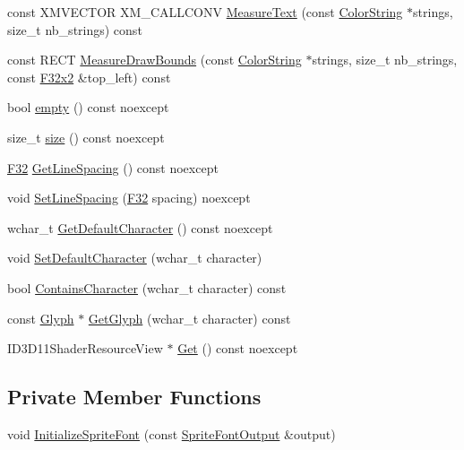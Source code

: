\begin{DoxyCompactItemize}
\item 
const X\+M\+V\+E\+C\+T\+OR X\+M\+\_\+\+C\+A\+L\+L\+C\+O\+NV \hyperlink{classmage_1_1_sprite_font_a1863253a1c804f854c019d837272e892}{Measure\+Text} (const \hyperlink{classmage_1_1_color_string}{Color\+String} $\ast$strings, size\+\_\+t nb\+\_\+strings) const
\item 
const R\+E\+CT \hyperlink{classmage_1_1_sprite_font_af0c58192fcf484c008ee17e79cab3f4e}{Measure\+Draw\+Bounds} (const \hyperlink{classmage_1_1_color_string}{Color\+String} $\ast$strings, size\+\_\+t nb\+\_\+strings, const \hyperlink{namespacemage_aa87237ad091f5cd7da612b8523fc108f}{F32x2} \&top\+\_\+left) const
\item 
bool \hyperlink{classmage_1_1_sprite_font_a5bb9c8d6288fdc50008bd24312b78e4f}{empty} () const noexcept
\item 
size\+\_\+t \hyperlink{classmage_1_1_sprite_font_a2c80b7c8c460c6fc9edacc78ba4476cb}{size} () const noexcept
\item 
\hyperlink{namespacemage_aa97e833b45f06d60a0a9c4fc22ae02c0}{F32} \hyperlink{classmage_1_1_sprite_font_ac64978e793aa09bf3fa163b02071ab5b}{Get\+Line\+Spacing} () const noexcept
\item 
void \hyperlink{classmage_1_1_sprite_font_afcbdf433fea7da7802c23ef53eb9e5ad}{Set\+Line\+Spacing} (\hyperlink{namespacemage_aa97e833b45f06d60a0a9c4fc22ae02c0}{F32} spacing) noexcept
\item 
wchar\+\_\+t \hyperlink{classmage_1_1_sprite_font_a9be513809e714558708cab21a22d7316}{Get\+Default\+Character} () const noexcept
\item 
void \hyperlink{classmage_1_1_sprite_font_a0b0feb25673d6f9d9e3215167800d817}{Set\+Default\+Character} (wchar\+\_\+t character)
\item 
bool \hyperlink{classmage_1_1_sprite_font_a01836c4197661dbdd66c624d8dc6a7c3}{Contains\+Character} (wchar\+\_\+t character) const
\item 
const \hyperlink{structmage_1_1_glyph}{Glyph} $\ast$ \hyperlink{classmage_1_1_sprite_font_aa13424a1e0153ffb9433bb2cb416360b}{Get\+Glyph} (wchar\+\_\+t character) const
\item 
I\+D3\+D11\+Shader\+Resource\+View $\ast$ \hyperlink{classmage_1_1_sprite_font_a8e43f8d97fb7e5ee03ed49fb45ee1b5f}{Get} () const noexcept
\end{DoxyCompactItemize}
\subsection*{Private Member Functions}
\begin{DoxyCompactItemize}
\item 
void \hyperlink{classmage_1_1_sprite_font_ae0edccbf98f4bd3b3195fa602baee121}{Initialize\+Sprite\+Font} (const \hyperlink{structmage_1_1_sprite_font_output}{Sprite\+Font\+Output} \&output)
\end{DoxyCompactItemize}
